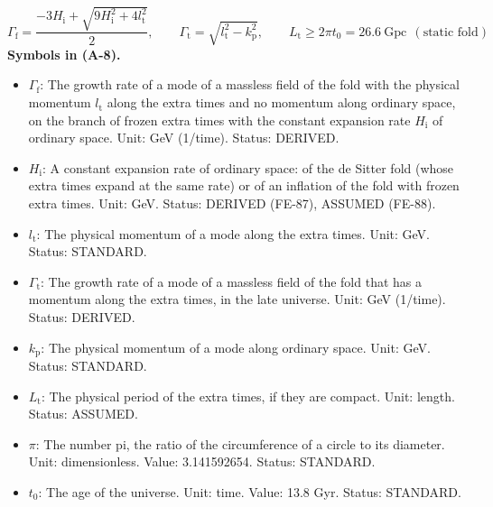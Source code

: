\documentclass[
  10pt,
]{article}
\providecommand{\tightlist}{%
  \setlength{\itemsep}{0pt}\setlength{\parskip}{0pt}}
\begin{document}
\[
\Gamma_{\mathrm{f}} = \frac{-3H_{\mathrm{i}} + \sqrt{9H_{\mathrm{i}}^2 + 4l_{\mathrm{t}}^2}}{2},\qquad
\Gamma_{\mathrm{t}} = \sqrt{l_{\mathrm{t}}^2 - k_{\mathrm{p}}^2},\qquad L_{\mathrm{t}} \ge 2\pi t_0 = 26.6\ \text{Gpc}\ \ (\text{static fold}) \tag{A-8}
\] \textbf{Symbols in (A-8).}

\begin{itemize}
\tightlist
\item
  \(\Gamma_{\mathrm{f}}\): The growth rate of a mode of a massless field
  of the fold with the physical momentum \(l_{\mathrm{t}}\) along the
  extra times and no momentum along ordinary space, on the branch of
  frozen extra times with the constant expansion rate \(H_{\mathrm{i}}\)
  of ordinary space. Unit: GeV (1/time). Status: DERIVED.
\item
  \(H_{\mathrm{i}}\): A constant expansion rate of ordinary space: of
  the de Sitter fold (whose extra times expand at the same rate) or of
  an inflation of the fold with frozen extra times. Unit: GeV. Status:
  DERIVED (FE-87), ASSUMED (FE-88).
\item
  \(l_{\mathrm{t}}\): The physical momentum of a mode along the extra
  times. Unit: GeV. Status: STANDARD.
\item
  \(\Gamma_{\mathrm{t}}\): The growth rate of a mode of a massless field
  of the fold that has a momentum along the extra times, in the late
  universe. Unit: GeV (1/time). Status: DERIVED.
\item
  \(k_{\mathrm{p}}\): The physical momentum of a mode along ordinary
  space. Unit: GeV. Status: STANDARD.
\item
  \(L_{\mathrm{t}}\): The physical period of the extra times, if they
  are compact. Unit: length. Status: ASSUMED.
\item
  \(\pi\): The number pi, the ratio of the circumference of a circle to
  its diameter. Unit: dimensionless. Value: 3.141592654. Status:
  STANDARD.
\item
  \(t_0\): The age of the universe. Unit: time. Value: 13.8 Gyr. Status:
  STANDARD.
\end{itemize}
\end{document}
